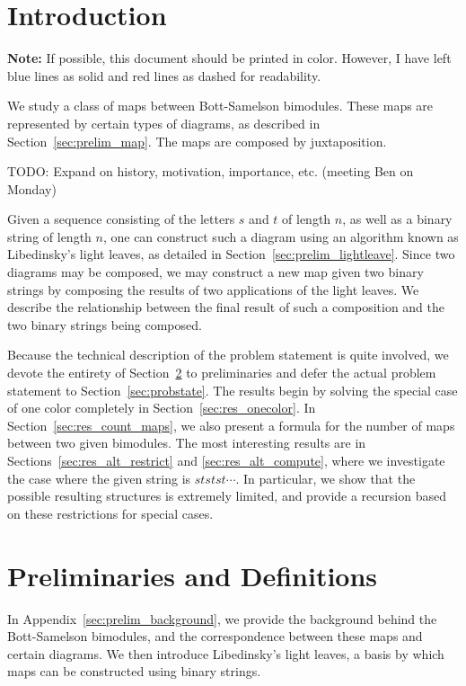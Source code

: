 
\section{Introduction}
\textbf{Note:} If possible, this document should be printed in color.  However, I have left blue lines as solid and red lines as dashed for readability.

We study a class of maps between Bott-Samelson bimodules.  These maps are represented by certain types of diagrams, as described in Section~\ref{sec:prelim_map}.  The maps are composed by juxtaposition.

TODO: Expand on history, motivation, importance, etc. (meeting Ben on Monday)

Given a sequence consisting of the letters $s$ and $t$ of length $n$, as well as a binary string of length $n$, one can construct such a diagram using an algorithm known as Libedinsky's light leaves, as detailed in Section~\ref{sec:prelim_lightleave}.  Since two diagrams may be composed, we may construct a new map given two binary strings by composing the results of two applications of the light leaves.  We describe the relationship between the final result of such a composition and the two binary strings being composed.

Because the technical description of the problem statement is quite involved, we devote the entirety of Section~\ref{sec:prelim} to preliminaries and defer the actual problem statement to Section~\ref{sec:probstate}.  The results begin by solving the special case of one color completely in Section~\ref{sec:res_onecolor}.  In Section~\ref{sec:res_count_maps}, we also present a formula for the number of maps between two given bimodules.  The most interesting results are in Sections~\ref{sec:res_alt_restrict} and \ref{sec:res_alt_compute}, where we investigate the case where the given string is $ststst\cdots$.  In particular, we show that the possible resulting structures is extremely limited, and provide a recursion based on these restrictions for special cases. 

\section{Preliminaries and Definitions}
\label{sec:prelim}
In Appendix~\ref{sec:prelim_background}, we provide the background behind the Bott-Samelson bimodules, and the correspondence between these maps and certain diagrams.  We then introduce Libedinsky's light leaves, a basis by which maps can be constructed using binary strings.

